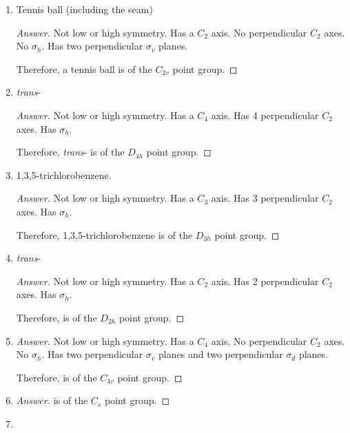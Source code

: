 \documentclass[../psets.tex]{subfiles}
\begin{document}
\begin{enumerate}[label={\Roman*)}]
\begin{enumerate}[label={\alph*)}]
\begin{proof}[Answer]
        \end{proof}
        \item Tennis ball (including the seam)
        \begin{proof}[Answer]
            Not low or high symmetry. Has a $C_2$ axis. No perpendicular $C_2$ axes. No $\sigma_h$. Has two perpendicular $\sigma_v$ planes.\par
            Therefore, a tennis ball is of the $C_{2v}$ point group.
        \end{proof}
        \item \emph{trans}-\ce{[CrCl2(H2O)4]+}
        \begin{proof}[Answer]
            Not low or high symmetry. Has a $C_4$ axis. Has 4 perpendicular $C_2$ axes. Has $\sigma_h$.\par
            Therefore, \emph{trans}-\ce{[CrCl2(H2O)4]+} is of the $D_{4h}$ point group.
        \end{proof}
        \item 1,3,5-trichlorobenzene.
        \begin{proof}[Answer]
            Not low or high symmetry. Has a $C_3$ axis. Has 3 perpendicular $C_2$ axes. Has $\sigma_h$.\par
            Therefore, 1,3,5-trichlorobenzene is of the $D_{3h}$ point group.
        \end{proof}
        \item \emph{trans}-
        \begin{proof}[Answer]
            Not low or high symmetry. Has a $C_2$ axis. Has 2 perpendicular $C_2$ axes. Has $\sigma_h$.\par
            Therefore,  is of the $D_{2h}$ point group.
        \end{proof}
        \item {}
        \begin{proof}[Answer]
            Not low or high symmetry. Has a $C_4$ axis. No perpendicular $C_2$ axes. No $\sigma_h$. Has two perpendicular $\sigma_v$ planes and two perpendicular $\sigma_d$ planes.\par
            Therefore,  is of the $C_{4v}$ point group.
        \end{proof}
        \item {}
        \begin{proof}[Answer]
             is of the $C_s$ point group.
        \end{proof}
        \item {}

\end{enumerate}
\end{enumerate}
\end{document}

